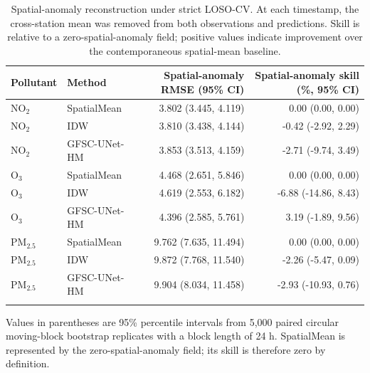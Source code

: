 \begin{table}[t]
\centering
\caption{Spatial-anomaly reconstruction under strict LOSO-CV. At each timestamp, the cross-station mean was removed from both observations and predictions. Skill is relative to a zero-spatial-anomaly field; positive values indicate improvement over the contemporaneous spatial-mean baseline.}
\label{tab:spatial_anomaly_skill}
\small
\begin{tabular}{llrr}
\toprule
Pollutant & Method & Spatial-anomaly RMSE (95\% CI) & Spatial-anomaly skill (\%, 95\% CI) \\
\midrule
$\mathrm{NO}_2$ & SpatialMean & 3.802 (3.445, 4.119) & 0.00 (0.00, 0.00) \\
$\mathrm{NO}_2$ & IDW & 3.810 (3.438, 4.144) & -0.42 (-2.92, 2.29) \\
$\mathrm{NO}_2$ & GFSC-UNet-HM & 3.853 (3.513, 4.159) & -2.71 (-9.74, 3.49) \\
\addlinespace
$\mathrm{O}_3$ & SpatialMean & 4.468 (2.651, 5.846) & 0.00 (0.00, 0.00) \\
$\mathrm{O}_3$ & IDW & 4.619 (2.553, 6.182) & -6.88 (-14.86, 8.43) \\
$\mathrm{O}_3$ & GFSC-UNet-HM & 4.396 (2.585, 5.761) & 3.19 (-1.89, 9.56) \\
\addlinespace
$\mathrm{PM}_{2.5}$ & SpatialMean & 9.762 (7.635, 11.494) & 0.00 (0.00, 0.00) \\
$\mathrm{PM}_{2.5}$ & IDW & 9.872 (7.768, 11.540) & -2.26 (-5.47, 0.09) \\
$\mathrm{PM}_{2.5}$ & GFSC-UNet-HM & 9.904 (8.034, 11.458) & -2.93 (-10.93, 0.76) \\
\addlinespace
\bottomrule
\end{tabular}
\vspace{2pt}
\parbox{0.98\textwidth}{\footnotesize Values in parentheses are 95\% percentile intervals from 5,000 paired circular moving-block bootstrap replicates with a block length of 24 h. SpatialMean is represented by the zero-spatial-anomaly field; its skill is therefore zero by definition.}
\end{table}
